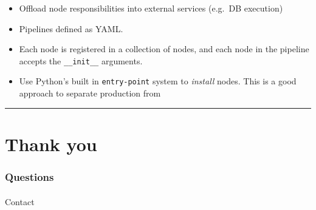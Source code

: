 \documentclass[
  letterpaper,
  DIV=11,
  numbers=noendperiod]{scrartcl}
\makeatletter
\let\oldparagraph\paragraph
\renewcommand{\paragraph}{
    \@ifstar
      \xxxParagraphStar
      \xxxParagraphNoStar
  }
\newcommand{\xxxParagraphStar}[1]{\oldparagraph*{#1}\mbox{}}
\newcommand{\xxxParagraphNoStar}[1]{\oldparagraph{#1}\mbox{}}
\providecommand{\tightlist}{%
  \setlength{\itemsep}{0pt}\setlength{\parskip}{0pt}}
\makeatother
\begin{document}
\begin{itemize}
\tightlist
\item
  Offload node responsibilities into external services (e.g.~DB
  execution)
\item
  Pipelines defined as YAML.
\item
  Each node is registered in a collection of nodes, and each node in the
  pipeline accepts the \texttt{\_\_init\_\_} arguments.
\item
  Use Python's built in \texttt{entry-point} system to \emph{install}
  nodes. This is a good approach to separate production from
\end{itemize}

\begin{center}\rule{0.5\linewidth}{0.5pt}\end{center}

\section{Thank you}\label{thank-you}

\subsubsection{Questions}\label{questions}

\paragraph{Contact}\label{contact}
\end{document}
